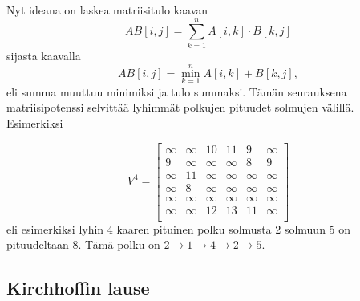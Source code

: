 Nyt ideana on laskea matriisitulo kaavan
\[
AB[i,j] = \sum_{k=1}^n A[i,k] \cdot B[k,j]
\]
sijasta kaavalla
\[
AB[i,j] = \min_{k=1}^n A[i,k] + B[k,j],
\]
eli summa muuttuu minimiksi ja tulo summaksi.
Tämän seurauksena matriisipotenssi
selvittää lyhimmät polkujen pituudet solmujen
välillä. Esimerkiksi

\[
V^4= \begin{bmatrix}
  \infty & \infty & 10 & 11 & 9 & \infty \\
  9 & \infty & \infty & \infty & 8 & 9 \\
  \infty & 11 & \infty & \infty & \infty & \infty \\
  \infty & 8 & \infty & \infty & \infty & \infty \\
  \infty & \infty & \infty & \infty & \infty & \infty \\
  \infty & \infty & 12 & 13 & 11 & \infty \\
 \end{bmatrix}
\]
eli esimerkiksi lyhin 4 kaaren pituinen polku
solmusta 2 solmuun 5 on pituudeltaan 8.
Tämä polku on $2 \rightarrow 1 \rightarrow 4 \rightarrow 2 \rightarrow 5$.

\subsection{Kirchhoffin lause}



